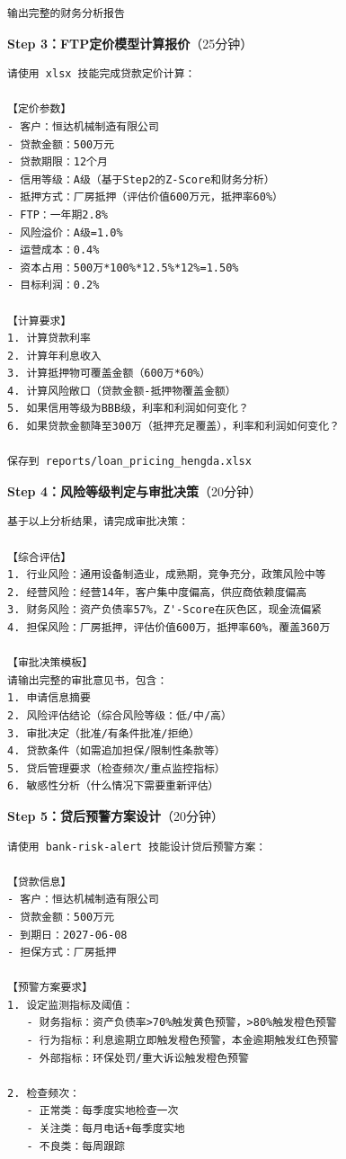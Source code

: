 \begin{exercisebox}
\begin{lstlisting}
输出完整的财务分析报告
\end{lstlisting}

\textbf{Step 3：FTP定价模型计算报价}（25分钟）

\begin{lstlisting}
请使用 xlsx 技能完成贷款定价计算：

【定价参数】
- 客户：恒达机械制造有限公司
- 贷款金额：500万元
- 贷款期限：12个月
- 信用等级：A级（基于Step2的Z-Score和财务分析）
- 抵押方式：厂房抵押（评估价值600万元，抵押率60%）
- FTP：一年期2.8%
- 风险溢价：A级=1.0%
- 运营成本：0.4%
- 资本占用：500万*100%*12.5%*12%=1.50%
- 目标利润：0.2%

【计算要求】
1. 计算贷款利率
2. 计算年利息收入
3. 计算抵押物可覆盖金额（600万*60%）
4. 计算风险敞口（贷款金额-抵押物覆盖金额）
5. 如果信用等级为BBB级，利率和利润如何变化？
6. 如果贷款金额降至300万（抵押充足覆盖），利率和利润如何变化？

保存到 reports/loan_pricing_hengda.xlsx
\end{lstlisting}

\textbf{Step 4：风险等级判定与审批决策}（20分钟）

\begin{lstlisting}
基于以上分析结果，请完成审批决策：

【综合评估】
1. 行业风险：通用设备制造业，成熟期，竞争充分，政策风险中等
2. 经营风险：经营14年，客户集中度偏高，供应商依赖度偏高
3. 财务风险：资产负债率57%，Z'-Score在灰色区，现金流偏紧
4. 担保风险：厂房抵押，评估价值600万，抵押率60%，覆盖360万

【审批决策模板】
请输出完整的审批意见书，包含：
1. 申请信息摘要
2. 风险评估结论（综合风险等级：低/中/高）
3. 审批决定（批准/有条件批准/拒绝）
4. 贷款条件（如需追加担保/限制性条款等）
5. 贷后管理要求（检查频次/重点监控指标）
6. 敏感性分析（什么情况下需要重新评估）
\end{lstlisting}

\textbf{Step 5：贷后预警方案设计}（20分钟）

\begin{lstlisting}
请使用 bank-risk-alert 技能设计贷后预警方案：

【贷款信息】
- 客户：恒达机械制造有限公司
- 贷款金额：500万元
- 到期日：2027-06-08
- 担保方式：厂房抵押

【预警方案要求】
1. 设定监测指标及阈值：
   - 财务指标：资产负债率>70%触发黄色预警，>80%触发橙色预警
   - 行为指标：利息逾期立即触发橙色预警，本金逾期触发红色预警
   - 外部指标：环保处罚/重大诉讼触发橙色预警

2. 检查频次：
   - 正常类：每季度实地检查一次
   - 关注类：每月电话+每季度实地
   - 不良类：每周跟踪


\end{lstlisting}
\end{exercisebox}
